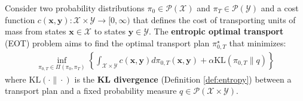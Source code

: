 \documentclass{article}
\begin{document}
\begin{definition}\label{def:eot-problem}
    Consider two probability distributions $\pi_0\in \mathcal{P}(\mathcal{X})$ and $\pi_T\in \mathcal{P}(\mathcal{Y})$ and a cost function $c(\boldsymbol{x},\boldsymbol{y}):\mathcal{X}\times \mathcal{Y}\to [0,\infty)$ that defines the cost of transporting units of mass from states $\boldsymbol{x}\in \mathcal{X}$ to states $\boldsymbol{y}\in \mathcal{Y}$. The \textbf{entropic optimal transport} (EOT) problem aims to find the optimal transport plan $\pi^\star_{0,T}$ that minimizes:
    \begin{align}
        \inf_{\pi_{0,T}\in \Pi(\pi_0, \pi_T)}\left\{\int_{\mathcal{X}\times \mathcal{Y}}c(\boldsymbol{x},\boldsymbol{y})d\pi_{0,T}(\boldsymbol{x},\boldsymbol{y})+\alpha \text{KL} (\pi_{0,T}\|q)\right\}\tag{Entropic OT Problem}\label{eq:entropic-ot-problem}
    \end{align}
    where $\text{KL}(\cdot \|\cdot)$ is the \textbf{KL divergence} (Definition \ref{def:entropy}) between a transport plan and a fixed probability measure $q\in \mathcal{P}(\mathcal{X}\times\mathcal{Y})$.
\end{definition}
\end{document}
